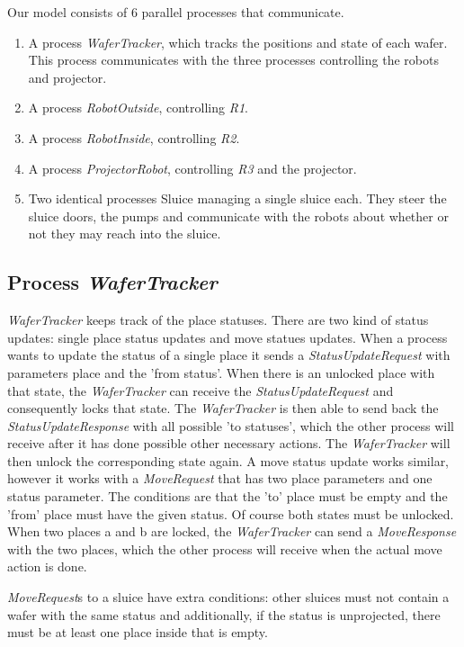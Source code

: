 
Our model consists of 6 parallel processes that communicate.
\begin{enumerate}
 \item A process \emph{WaferTracker}, which tracks the positions and state of each wafer. This process communicates with the three processes controlling the robots and projector.
 \item A process \emph{RobotOutside}, controlling \emph{R1}.
 \item A process \emph{RobotInside}, controlling \emph{R2}.
 \item A process \emph{ProjectorRobot}, controlling \emph{R3} and the projector.
 \item Two identical processes Sluice managing a single sluice each. They steer the sluice doors, the pumps and communicate with the robots about whether or not they may reach into the sluice.
\end{enumerate}

\subsection{Process \emph{WaferTracker}}

\emph{WaferTracker} keeps track of the place statuses. There are two kind of status
updates: single place status updates and move statues updates. When a
process wants to update the status of a single place it sends a
\emph{StatusUpdateRequest} with parameters place and the 'from status'. When there
is an unlocked place with that state, the \emph{WaferTracker} can receive the
\emph{StatusUpdateRequest} and consequently locks that state. The \emph{WaferTracker} is
then able to send back the \emph{StatusUpdateResponse} with all possible 'to
statuses', which the other process will receive after it has done possible
other necessary actions. The \emph{WaferTracker} will then unlock the corresponding
state again. A move status update works similar, however it works with a
\emph{MoveRequest} that has two place parameters and one status parameter. The
conditions are that the 'to' place must be empty and the 'from' place must
have the given status. Of course both states must be unlocked. When two
places a and b are locked, the \emph{WaferTracker} can send a \emph{MoveResponse} with
the two places, which the other process will receive when the actual move
action is done.

\emph{MoveRequest}s to a sluice have extra conditions: other sluices must not
contain a wafer with the same status and additionally, if the status is
unprojected, there must be at least one place inside that is empty.

